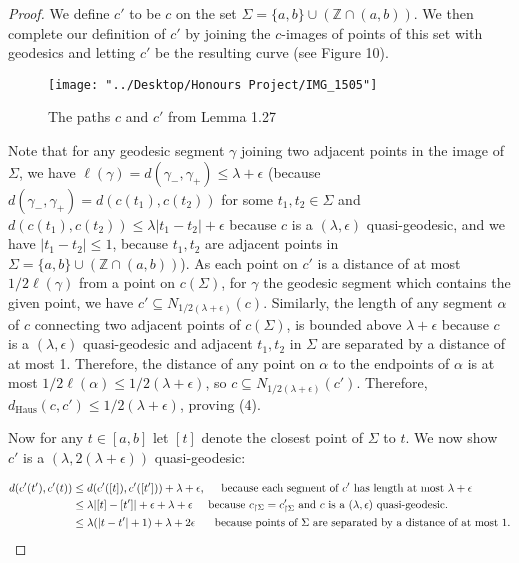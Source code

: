 \documentclass[12pt]{article}
\newcommand{\vs}{\vskip10pt}
\begin{document}
	\begin{proof}
		
		We define $c'$ to be $c$ on the set $\Sigma = \{a,b\} \cup (\mathbb{Z} \cap (a,b))$. We then complete our definition of $c'$ by joining the $c$-images of points of this set with geodesics and letting $c'$ be the resulting curve (see Figure 10). 
		
\begin{figure} [H]
	\centering
	\texttt{[image: "../Desktop/Honours Project/IMG\_1505"]}
	\caption{The paths $c$ and $c'$ from Lemma 1.27}
	\label{fig:img1505}
\end{figure}
		
		\vs
		
		Note that for any geodesic segment $\gamma$ joining two adjacent points in the image of $\Sigma$, we have $\ell(\gamma) = d(\gamma_{-}, \gamma_{+}) \leq \lambda + \epsilon$ (because $d(\gamma_{-}, \gamma_{+}) = d(c(t_1), c(t_2))$ for some $t_1, t_2 \in \Sigma$ and $d(c(t_1), c(t_2)) \leq \lambda \vert t_1 - t_2 \vert + \epsilon$ because $c$ is a $(\lambda, \epsilon)$ quasi-geodesic, and we have $\vert t_1 - t_2 \vert \leq 1$, because $t_1, t_2$ are adjacent points in $\Sigma = \{a,b\} \cup (\mathbb{Z} \cap (a,b))$). As each point on $c'$ is a distance of at most $1/2 \ell(\gamma)$ from a point on $c(\Sigma)$, for $\gamma$ the geodesic segment which contains the given point, we have $c' \subseteq N_{1/2 (\lambda + \epsilon)} (c)$. Similarly, the length of any segment $\alpha$ of $c$ connecting two adjacent points of $c(\Sigma)$, is bounded above $\lambda + \epsilon$ because $c$ is a $(\lambda, \epsilon)$ quasi-geodesic and adjacent $t_1, t_2$ in $\Sigma$ are separated by a distance of at most 1. Therefore, the distance of any point on $\alpha$ to the endpoints of $\alpha$ is at most $1/2 \ell(\alpha) \leq 1/2 (\lambda + \epsilon)$, so $c \subseteq N_{1/2 (\lambda + \epsilon)} (c')$. Therefore, $d_{\text{Haus}}(c, c') \leq 1/2 (\lambda + \epsilon)$, proving (4). 
		
		\vs 
		
		Now for any $t \in [a,b]$ let $[t]$ denote the closest point of $\Sigma$ to $t$. We now show $c'$ is a $(\lambda, 2(\lambda + \epsilon))$ quasi-geodesic: 
		
		\vs 
		
		\begin{align*}
		d(c'(t'), c'(t)) &\leq d(c'([t]), c'([t'])) + \lambda + \epsilon, \hspace{0.5cm} \text{because each segment of } c' \text{ has length at most } \lambda + \epsilon \\
		&\leq \lambda \vert [t] - [t'] \vert + \epsilon + \lambda + \epsilon \hspace{0.5cm} \text{because } c_{\restriction \Sigma} = c'_{\restriction \Sigma} \text{ and } c \text{ is a } (\lambda, \epsilon) \text{ quasi-geodesic}. \\
		&\leq \lambda( \vert t - t' \vert + 1) + \lambda + 2 \epsilon \hspace{0.5cm} \text{ because points of } \Sigma \text{ are separated by a distance of at most } 1. 
 		\end{align*}
 		

\end{proof}
\end{document}
